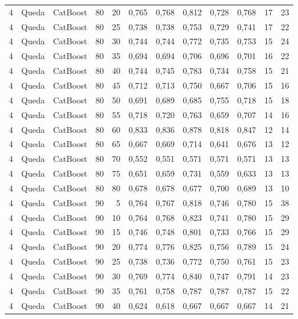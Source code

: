 \begin{longtable}{@{}rllrrrrrrrrr@{}}
4 & Queda & CatBoost & 80 & 20 & 0,765 & 0,768 & 0,812 & 0,728 & 0,768 & 17 & 23 \\
4 & Queda & CatBoost & 80 & 25 & 0,738 & 0,738 & 0,753 & 0,729 & 0,741 & 17 & 22 \\
4 & Queda & CatBoost & 80 & 30 & 0,744 & 0,744 & 0,772 & 0,735 & 0,753 & 15 & 24 \\
4 & Queda & CatBoost & 80 & 35 & 0,694 & 0,694 & 0,706 & 0,696 & 0,701 & 16 & 22 \\
4 & Queda & CatBoost & 80 & 40 & 0,744 & 0,745 & 0,783 & 0,734 & 0,758 & 15 & 21 \\
4 & Queda & CatBoost & 80 & 45 & 0,712 & 0,713 & 0,750 & 0,667 & 0,706 & 15 & 16 \\
4 & Queda & CatBoost & 80 & 50 & 0,691 & 0,689 & 0,685 & 0,755 & 0,718 & 15 & 18 \\
4 & Queda & CatBoost & 80 & 55 & 0,718 & 0,720 & 0,763 & 0,659 & 0,707 & 14 & 16 \\
4 & Queda & CatBoost & 80 & 60 & 0,833 & 0,836 & 0,878 & 0,818 & 0,847 & 12 & 14 \\
4 & Queda & CatBoost & 80 & 65 & 0,667 & 0,669 & 0,714 & 0,641 & 0,676 & 13 & 12 \\
4 & Queda & CatBoost & 80 & 70 & 0,552 & 0,551 & 0,571 & 0,571 & 0,571 & 13 & 13 \\
4 & Queda & CatBoost & 80 & 75 & 0,651 & 0,659 & 0,731 & 0,559 & 0,633 & 13 & 13 \\
4 & Queda & CatBoost & 80 & 80 & 0,678 & 0,678 & 0,677 & 0,700 & 0,689 & 13 & 10 \\
4 & Queda & CatBoost & 90 & 5 & 0,764 & 0,767 & 0,818 & 0,746 & 0,780 & 15 & 38 \\
4 & Queda & CatBoost & 90 & 10 & 0,764 & 0,768 & 0,823 & 0,741 & 0,780 & 15 & 29 \\
4 & Queda & CatBoost & 90 & 15 & 0,746 & 0,748 & 0,801 & 0,733 & 0,766 & 15 & 29 \\
4 & Queda & CatBoost & 90 & 20 & 0,774 & 0,776 & 0,825 & 0,756 & 0,789 & 15 & 24 \\
4 & Queda & CatBoost & 90 & 25 & 0,738 & 0,736 & 0,772 & 0,750 & 0,761 & 15 & 23 \\
4 & Queda & CatBoost & 90 & 30 & 0,769 & 0,774 & 0,840 & 0,747 & 0,791 & 14 & 23 \\
4 & Queda & CatBoost & 90 & 35 & 0,761 & 0,758 & 0,787 & 0,787 & 0,787 & 15 & 22 \\
4 & Queda & CatBoost & 90 & 40 & 0,624 & 0,618 & 0,667 & 0,667 & 0,667 & 14 & 21 \\

\end{longtable}
